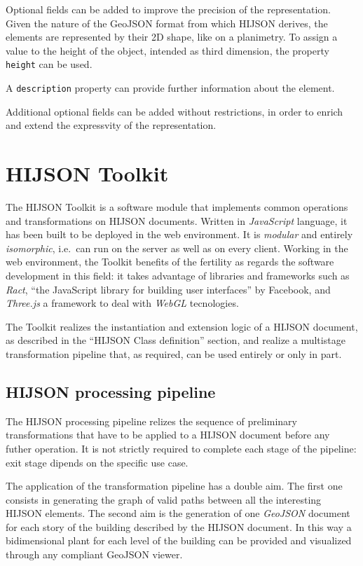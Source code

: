 \documentclass{sig-alternate}
\begin{document}
Optional fields can be added to improve the precision of the
representation. Given the nature of the GeoJSON format from which HIJSON
derives, the elements are represented by their 2D shape, like on a
planimetry. To assign a value to the height of the object, intended as
third dimension, the property \texttt{height} can be used.

A \texttt{description} property can provide further information about
the element.

Additional optional fields can be added without restrictions, in order 
to enrich and extend the expressvity of the representation.

\section{HIJSON Toolkit}\label{hijson-toolkit}

The HIJSON Toolkit is a software module that implements common
operations and transformations on HIJSON documents. Written in
\emph{JavaScript} language, it has been built to be deployed in the web
environment. It is \emph{modular} and entirely \emph{isomorphic},
i.e.~can run on the server as well as on every client. Working in the
web environment, the Toolkit benefits of the fertility as regards the
software development in this field: it takes advantage of libraries and
frameworks such as \emph{Ract}, ``the JavaScript library for building
user interfaces'' by Facebook, and \emph{Three.js} a framework to deal
with \emph{WebGL} tecnologies.

The Toolkit realizes the instantiation and extension logic of a HIJSON
document, as described in the ``HIJSON Class definition'' section, and
realize a multistage transformation pipeline that, as required, can be
used entirely or only in part.

\subsection{HIJSON processing pipeline}\label{hijson-processing-pipeline}

The HIJSON processing pipeline relizes the sequence of preliminary
transformations that have to be applied to a HIJSON document before any
futher operation. It is not strictly required to complete each stage of
the pipeline: exit stage dipends on the specific use case.

The application of the transformation pipeline has a double aim. The
first one consists in generating the graph of valid paths between all
the interesting HIJSON elements. The second aim is the generation of one
\emph{GeoJSON} document for each story of the building described by the
HIJSON document. In this way a bidimensional plant for each level of the
building can be provided and visualized through any compliant GeoJSON
viewer.
\end{document}
